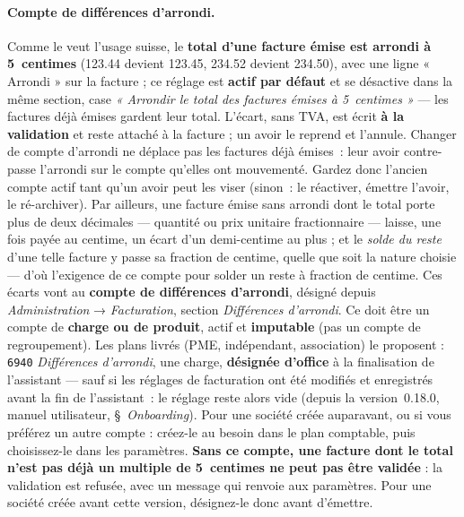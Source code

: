 \documentclass[a4paper,11pt,oneside]{article}
\begin{document}
\paragraph{Compte de différences d'arrondi.} Comme le veut l'usage suisse, le \textbf{total d'une facture émise est arrondi à 5~centimes} (123.44 devient 123.45, 234.52 devient 234.50), avec une ligne « Arrondi » sur la facture ; ce réglage est \textbf{actif par défaut} et se désactive dans la même section, case \emph{« Arrondir le total des factures émises à 5~centimes »} --- les factures déjà émises gardent leur total. L'écart, sans TVA, est écrit \textbf{à la validation} et reste attaché à la facture ; un avoir le reprend et l'annule. Changer de compte d'arrondi ne déplace pas les factures déjà émises~: leur avoir contre-passe l'arrondi sur le compte qu'elles ont mouvementé. Gardez donc l'ancien compte actif tant qu'un avoir peut les viser (sinon~: le réactiver, émettre l'avoir, le ré-archiver). Par ailleurs, une facture émise sans arrondi dont le total porte plus de deux décimales --- quantité ou prix unitaire fractionnaire --- laisse, une fois payée au centime, un écart d'un demi-centime au plus ; et le \emph{solde du reste} d'une telle facture y passe sa fraction de centime, quelle que soit la nature choisie --- d'où l'exigence de ce compte pour solder un reste à fraction de centime. Ces écarts vont au \textbf{compte de différences d'arrondi}, désigné depuis \emph{Administration} → \emph{Facturation}, section \emph{Différences d'arrondi}. Ce doit être un compte de \textbf{charge ou de produit}, actif et \textbf{imputable} (pas un compte de regroupement). Les plans livrés (PME, indépendant, association) le proposent : \texttt{6940} \emph{Différences d'arrondi}, une charge, \textbf{désignée d'office} à la finalisation de l'assistant --- sauf si les réglages de facturation ont été modifiés et enregistrés avant la fin de l'assistant~: le réglage reste alors vide (depuis la version~0.18.0, manuel utilisateur, \S~\emph{Onboarding}). Pour une société créée auparavant, ou si vous préférez un autre compte : créez-le au besoin dans le plan comptable, puis choisissez-le dans les paramètres. \textbf{Sans ce compte, une facture dont le total n'est pas déjà un multiple de 5~centimes ne peut pas être validée} : la validation est refusée, avec un message qui renvoie aux paramètres. Pour une société créée avant cette version, désignez-le donc avant d'émettre.
\end{document}
